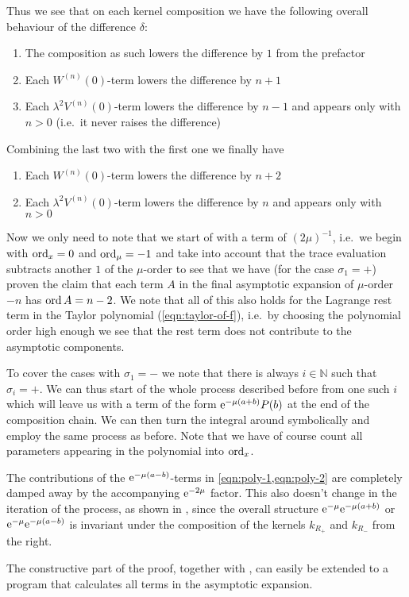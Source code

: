 \begin{MainTheorem}
\begin{Proof}
    Thus we see that on each kernel composition we have the following overall
    behaviour of the difference $\delta$: 
    \begin{enumerate}
      \item The composition as such lowers the difference by $1$ from the
        prefactor
      \item Each $W^{(n)}(0)$-term lowers the difference by $n+1$
      \item Each $\lambda^2 V^{(n)}(0)$-term lowers the difference by $n-1$ and
        appears only with $n > 0$ (i.e.\ it never raises the difference)
    \end{enumerate}
    Combining the last two with the first one we finally have
    \begin{enumerate}
      \item Each $W^{(n)}(0)$-term lowers the difference by $n+2$
      \item Each $\lambda^2 V^{(n)}(0)$-term lowers the difference by $n$ and
        appears only with $n > 0$
    \end{enumerate}
    Now we only need to note that we start of with a term of $(2\mu)^{-1}$,
    i.e.\ we begin with $\operatorname{ord}_x = 0$ and $\operatorname{ord}_\mu = -1$ and take into account
    that the trace evaluation subtracts another $1$ of the $\mu$-order to see
    that we have (for the case $\sigma_1 = +$) proven the claim that each term
    $A$ in the final asymptotic expansion of $\mu$-order $-n$ has $\operatorname{ord} A = n -
    2$. We note that all of this also holds for the Lagrange rest term in the
    Taylor polynomial (\cref{eqn:taylor-of-f}), i.e.\ by choosing the
    polynomial order high enough we see that the rest term does not contribute
    to the asymptotic components.

    To cover the cases with $\sigma_1 = -$ we note that there is always
    $i\in\mathbb{N}$ such that $\sigma_i = +$. We can thus start of the whole
    process described before from one such $i$ which will leave us with a term
    of the form $\mathrm e^{-\mu(a+b)}P(b)$ at the end of the composition chain. We
    can then turn the integral around symbolically and employ the same process
    as before. Note that we have of course count all parameters appearing in the
    polynomial into $\operatorname{ord}_x$.

    The contributions of the $\mathrm e^{-\mu(a-b)}$-terms in
    \cref{eqn:poly-1,eqn:poly-2} are completely damped away by the accompanying
    $\mathrm e^{-2\mu}$ factor. This also doesn't change in the iteration of the
    process, as shown in , since the overall structure
    $\mathrm e^{-\mu}\mathrm e^{-\mu(a+b)}$ or $\mathrm e^{-\mu}\mathrm e^{-\mu(a-b)}$ is invariant
    under the composition of the kernels $k_{R_+}$ and $k_{R_-}$ from the right.
  \end{Proof}
\end{MainTheorem}
The constructive part of the proof, together with , can
easily be extended to a program that calculates all terms in the asymptotic
expansion.
